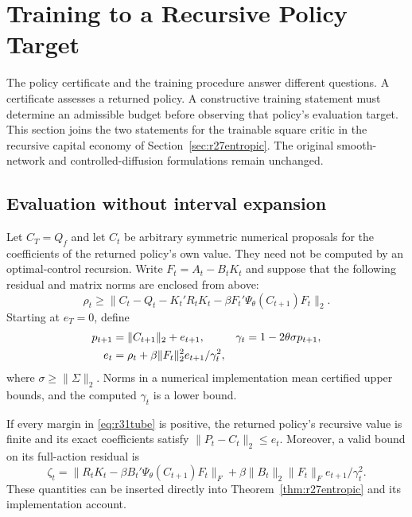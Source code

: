 \section{Training to a Recursive Policy Target}\label{sec:r31constructive}
The policy certificate and the training procedure answer different questions.
A certificate assesses a returned policy. A constructive training statement
must determine an admissible budget before observing that policy's evaluation
target. This section joins the two statements for the trainable square critic
in the recursive capital economy of Section~\ref{sec:r27entropic}. The original
smooth-network and controlled-diffusion formulations remain unchanged.

\subsection{Evaluation without interval expansion}
Let $C_T=Q_f$ and let $C_t$ be arbitrary symmetric numerical proposals for the
coefficients of the returned policy's own value. They need not be computed by
an optimal-control recursion. Write $F_t=A_t-B_tK_t$ and suppose that the
following residual and matrix norms are enclosed from above:
\[
 \rho_t\geq\|C_t-Q_t-K_t'R_tK_t-
                  \beta F_t'\Psi_\theta(C_{t+1})F_t\|_2.
\]
Starting at $e_T=0$, define
\begin{align}
 p_{t+1}&=\|C_{t+1}\|_2+e_{t+1},&
 \gamma_t&=1-2\theta\sigma p_{t+1},\notag\\
 e_t&=\rho_t+\beta\|F_t\|_2^2e_{t+1}/\gamma_t^2,
 \label{eq:r31tube}
\end{align}
where $\sigma\geq\|\Sigma\|_2$. Norms in a numerical implementation mean
certified upper bounds, and the computed $\gamma_t$ is a lower bound.

\begin{proposition}\label{prop:r31tube}
If every margin in \eqref{eq:r31tube} is positive, the returned policy's
recursive value is finite and its exact coefficients satisfy
$\|P_t-C_t\|_2\leq e_t$. Moreover, a valid bound on its full-action residual is
\begin{equation}
 \zeta_t=
 \|R_tK_t-\beta B_t'\Psi_\theta(C_{t+1})F_t\|_F
 +\beta\|B_t\|_2\|F_t\|_F e_{t+1}/\gamma_t^2.
 \label{eq:r31defect}
\end{equation}
These quantities can be inserted directly into
Theorem~\ref{thm:r27entropic} and its implementation account.
\end{proposition}

